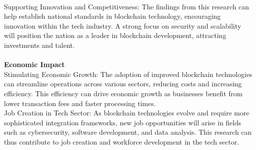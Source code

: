 \documentclass[a4paper, 12pt]{article}
\begin{document}
\\
Supporting Innovation and Competitiveness: The findings from this research can help establish national standards in blockchain technology, encouraging innovation within the tech industry. A strong focus on security and scalability will position the nation as a leader in blockchain development, attracting investments and talent.
\\
\\
\textbf{Economic Impact}
\\
Stimulating Economic Growth: The adoption of improved blockchain technologies can streamline operations across various sectors, reducing costs and increasing efficiency. This efficiency can drive economic growth as businesses benefit from lower transaction fees and faster processing times.
\\
Job Creation in Tech Sector: As blockchain technologies evolve and require more sophisticated integration frameworks, new job opportunities will arise in fields such as cybersecurity, software development, and data analysis. This research can thus contribute to job creation and workforce development in the tech sector.

{}
\end{document}
